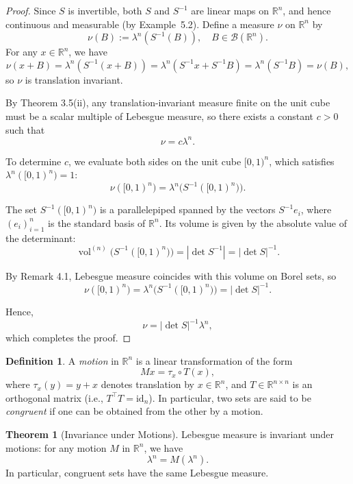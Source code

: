 \documentclass[12pt]{article}
\theoremstyle{definition}
\newtheorem{definition}{Definition}[section]
\newtheorem{theorem}{Theorem}[section]
\begin{document}
\begin{proof}
Since \( S \) is invertible, both \( S \) and \( S^{-1} \) are linear maps on \( \mathbb{R}^n \), and hence continuous and measurable (by Example~5.2). Define a measure \( \nu \) on \( \mathbb{R}^n \) by
\[
\nu(B) := \lambda^n(S^{-1}(B)), \quad B \in \mathcal{B}(\mathbb{R}^n).
\]
For any \( x \in \mathbb{R}^n \), we have
\[
\nu(x + B) = \lambda^n(S^{-1}(x + B)) = \lambda^n(S^{-1}x + S^{-1}B) = \lambda^n(S^{-1}B) = \nu(B),
\]
so \( \nu \) is translation invariant. 

By Theorem 3.5(ii), any translation-invariant measure finite on the unit cube must be a scalar multiple of Lebesgue measure, so there exists a constant \( c > 0 \) such that
\[
\nu = c \lambda^n.
\]

To determine \( c \), we evaluate both sides on the unit cube \( [0,1)^n \), which satisfies \( \lambda^n([0,1)^n) = 1 \):
\[
\nu([0,1)^n) = \lambda^n\bigl(S^{-1}([0,1)^n)\bigr).
\]

The set \( S^{-1}([0,1)^n) \) is a parallelepiped spanned by the vectors \( S^{-1} e_i \), where \( (e_i)_{i=1}^n \) is the standard basis of \( \mathbb{R}^n \). Its volume is given by the absolute value of the determinant:
\[
\operatorname{vol}^{(n)}\bigl(S^{-1}([0,1)^n)\bigr) = |\det S^{-1}| = |\det S|^{-1}.
\]

By Remark 4.1, Lebesgue measure coincides with this volume on Borel sets, so
\[
\nu([0,1)^n) = \lambda^n\bigl(S^{-1}([0,1)^n)\bigr) = |\det S|^{-1}.
\]

Hence,
\[
\nu = |\det S|^{-1} \lambda^n,
\]
which completes the proof.
\end{proof}

\medskip
\begin{definition}
A \emph{motion} in \( \mathbb{R}^n \) is a linear transformation of the form
\[
M x = \tau_x \circ T(x),
\]
where \( \tau_x(y) = y + x \) denotes translation by \( x \in \mathbb{R}^n \), and \( T \in \mathbb{R}^{n \times n} \) is an orthogonal matrix (i.e., \( T^\top T = \mathrm{id}_n \)). In particular, two sets are said to be \emph{congruent} if one can be obtained from the other by a motion.
\end{definition}

\medskip
\begin{theorem}[Invariance under Motions]
Lebesgue measure is invariant under motions: for any motion \( M \) in \( \mathbb{R}^n \), we have
\[
\lambda^n = M(\lambda^n).
\]
In particular, congruent sets have the same Lebesgue measure.
\end{theorem}
\end{document}
